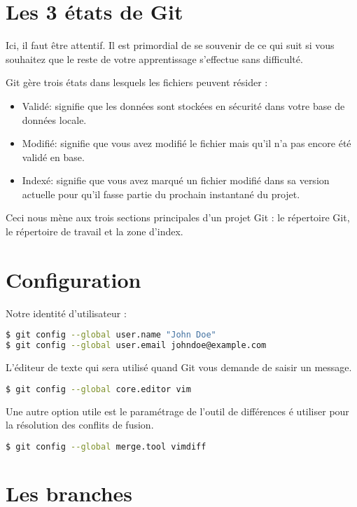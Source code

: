 \documentclass[10pt,a4paper]{report}
\begin{document}
\section{Les 3 \'etats de Git}

Ici, il faut \^etre attentif. Il est primordial de se souvenir de ce qui suit si vous souhaitez que le reste de votre apprentissage s'effectue sans difficult\'e. 

Git g\`ere trois \'etats dans lesquels les fichiers peuvent r\'esider : 
\begin{itemize}
\item Valid\'e: signifie que les donn\'ees sont stock\'ees en s\'ecurit\'e dans votre base de donn\'ees locale. 
\item Modifi\'e: signifie que vous avez modifi\'e le fichier mais qu'il n'a pas encore \'et\'e valid\'e en base. 
\item Index\'e: signifie que vous avez marqu\'e un fichier modifi\'e dans sa version actuelle pour qu'il fasse partie du prochain instantan\'e du projet.
\end{itemize}

Ceci nous m\`ene aux trois sections principales d'un projet Git : le r\'epertoire Git, le r\'epertoire de travail et la zone d'index.

\section{Configuration}

\noindent Notre identit\'e d'utilisateur :
\begin{lstlisting}[language=bash]
$ git config --global user.name "John Doe"
$ git config --global user.email johndoe@example.com
\end{lstlisting}

\noindent L'\'editeur de texte qui sera utilis\'e quand Git vous demande de saisir un message.
\begin{lstlisting}[language=bash]
$ git config --global core.editor vim
\end{lstlisting}

\noindent Une autre option utile est le param\'etrage de l'outil de diff\'erences \'e utiliser pour la r\'esolution des conflits de fusion.
\begin{lstlisting}[language=bash]
$ git config --global merge.tool vimdiff
\end{lstlisting}

\section{Les branches}
\end{document}
